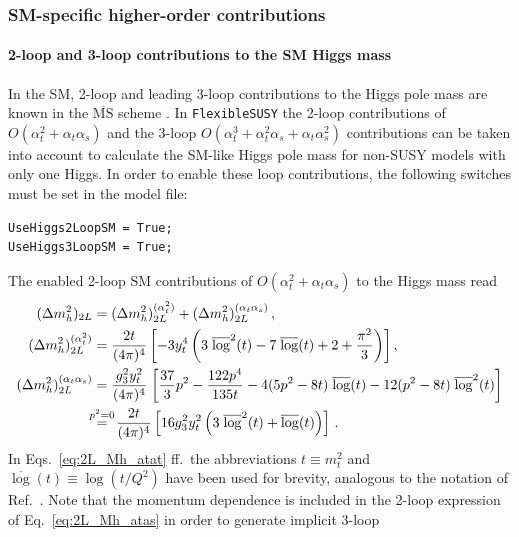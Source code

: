 \documentclass[final,3p,11pt,pdflatex]{elsarticle}
\makeatletter
\newcommand{\fs}{\texttt{FlexibleSUSY}\@\xspace}
\newcommand{\ol}[1]{\overline{#1}}
\newcommand{\MSbar}{\ensuremath{\ol{\text{MS}}}\xspace}
\newcommand{\barlog}{\overline{\log}}
\def\at{\alpha_t}
\def\as{\alpha_s}
\makeatother
\begin{document}
\subsubsection{SM-specific higher-order contributions}

\paragraph{2-loop and 3-loop contributions to the SM Higgs mass}

In the SM, 2-loop and leading 3-loop contributions to the Higgs pole
mass are known in the \MSbar scheme
\cite{Degrassi:2012ry,Martin:2014cxa,Vega:2015fna}.  In \fs the 2-loop
contributions of $O(\at^2 + \at \as)$
\cite{Degrassi:2012ry,Martin:2014cxa} and the 3-loop
$O(\at^3 + \at^2 \as + \at \as^2)$ contributions \cite{Martin:2014cxa}
can be taken into account to calculate the SM-like Higgs pole mass for
non-SUSY models with only one Higgs.  In order to enable these loop
contributions, the following switches must be set in the model file:
%
\begin{lstlisting}
UseHiggs2LoopSM = True;
UseHiggs3LoopSM = True;
\end{lstlisting}
%
The enabled 2-loop SM contributions of
$O(\at^2 + \at \as)$ to the Higgs mass read
%
\begin{align}
  (\Delta m_h^2)_{2L} &= (\Delta m_h^2)_{2L}^{(\at^2)} + (\Delta m_h^2)_{2L}^{(\at\as)} \,, \\
  (\Delta m_h^2)_{2L}^{(\at^2)} &=
  \frac{2 t}{(4\pi)^4} \left[
    -3 y_t^4 \left(3 \;\barlog^2(t) - 7 \;\barlog(t) + 2 + \frac{\pi^2}{3}\right)
  \right] , \label{eq:2L_Mh_atat}\\
  (\Delta m_h^2)_{2L}^{(\at\as)} &=
      \frac{g_3^2 y_t^2}{(4\pi)^4} \;\bigg[
        \frac{37}{3} p^2 - \frac{122 p^4}{135 t} - 4 (5 p^2 - 8 t) \;\barlog(t) -
        12 (p^2 - 8 t) \;\barlog^2(t) \bigg] \label{eq:2L_Mh_atas} \\
  &\stackrel{\mathmakebox[\widthof{=}]{p^2=0}}{=} \
  \frac{2 t}{(4\pi)^4} \left[
    16 g_3^2 y_t^2 \left(3 \;\barlog^2(t) + \barlog(t)\right)
  \right] \,.
\end{align}
%
In Eqs.~\eqref{eq:2L_Mh_atat} ff.\ the abbreviations
$t \equiv m_t^2$ and $\barlog(t) \equiv \log(t/Q^2)$ have been used
for brevity, analogous to the notation of Ref.~\cite{Martin:2014cxa}.  Note
that the momentum dependence is included in the 2-loop expression of
Eq.~\eqref{eq:2L_Mh_atas} in order to generate implicit 3-loop
\end{document}
